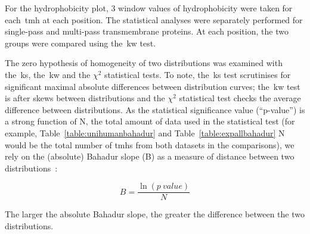 For the hydrophobicity plot, 3 window values of hydrophobicity were taken for each~\gls{tmh} at each position.
The statistical analyses were separately performed for single\--pass and multi\--pass transmembrane proteins.
At each position, the two groups were compared using the~\gls{kw} test.

The zero hypothesis of homogeneity of two distributions was examined with the~\gls{ks}, the~\gls{kw} and the \({\chi}^{2}\) statistical tests.
To note, the~\gls{ks} test scrutinises for significant maximal absolute differences between distribution curves; the~\gls{kw} test is after skews between distributions and the \({\chi}^{2}\) statistical test checks the average difference between distributions.
As the statistical significance value (``p\--value'') is a strong function of N, the total amount of data used in the statistical test (for example, Table~\ref{table:unihumanbahadur} and Table~\ref{table:expallbahadur} N would be the total number of \gls{tmh}s from both datasets in the comparisons), we rely on the (absolute) Bahadur slope (B) as a measure of distance between two distributions~\cite{Bahadur1967, Bahadur1971}:

\begin{equation} \label{eq:bahadur}
B=\frac{\ln(p~value)}{N}
\end{equation}

The larger the absolute Bahadur slope, the greater the difference between the two distributions.
